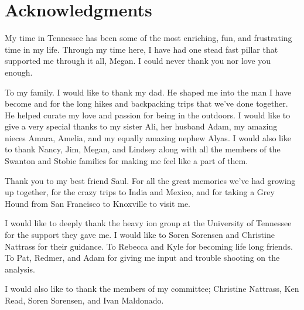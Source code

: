\chapter*{Acknowledgments}\label{ch:acknowledgments}
My time in Tennessee has been some of the most enriching, fun, and frustrating time in my life.  Through my time here, I have had one stead fast pillar that supported me through it all, Megan.  I could never thank you nor love you enough.

\par
To my family. I would like to thank my dad.  He shaped  me into the man I have become and for the long hikes and backpacking trips that we've done together.  He helped curate my love and passion for being in the outdoors.  I would like to give a very special thanks to my sister Ali, her husband Adam, my amazing nieces Amara, Amelia, and my equally amazing nephew Alyas.  I would also like to thank Nancy, Jim, Megan, and Lindsey along with all the members of the Swanton and Stobie families for making me feel like a part of them.  

\par
Thank you to my best friend Saul.  For all the great memories we've had growing up together, for the crazy trips to India and Mexico, and for taking a Grey Hound from San Francisco to Knoxville to visit me.  

\par
I would like to deeply thank the heavy ion group at the University of Tennessee for the support they gave me.  I would like to Soren Sorensen and Christine Nattrass for their guidance.  To Rebecca and Kyle for becoming life long friends.  To Pat, Redmer, and Adam for giving me input and trouble shooting on the analysis.

\par 
I would also like to thank the members of my committee; Christine Nattrass, Ken Read, Soren Sorensen, and Ivan Maldonado. 


